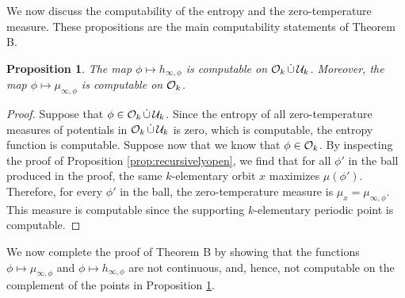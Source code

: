 \documentclass[11pt, reqno]{amsart}
\newtheorem{proposition}[theorem]{Proposition}
\newcommand{\cU}{{\mathcal U}}
\begin{document}
We now discuss the computability of the entropy and the zero-temperature measure.  These propositions are the main computability statements of Theorem B.

\begin{proposition}\label{prop:computability}
The map $\phi\mapsto h_{\infty,\phi}$ is computable on $\cO_k\,\dot\cup\,\cU_k$.  Moreover, the map $\phi\mapsto \mu_{\infty,\phi}$ is computable on $\mathcal O_k$.
\end{proposition}
\begin{proof}
Suppose that $\phi\in\cO_k\,\dot\cup\,\cU_k$.  Since the entropy of all zero-temperature measures of potentials in $\cO_k\,\dot\cup\,\cU_k$ is zero, which is computable, the entropy function is computable.  Suppose now that we know that $\phi\in\mathcal O_k$.  By inspecting the proof of Proposition \ref{prop:recursivelyopen}, we find that for all $\phi'$ in the ball produced in the proof, the same $k$-elementary orbit $x$ maximizes $\mu(\phi')$.  Therefore, for every $\phi'$ in the ball, the zero-temperature measure is $\mu_x=\mu_{\infty,\phi}$.  This measure is computable since the supporting $k$-elementary periodic point is computable.
\end{proof}

We now complete the proof of Theorem B by showing that the functions $\phi\mapsto \mu_{\infty,\phi}$ and $\phi\mapsto h_{\infty,\phi}$ are not continuous, and, hence, not computable on the complement of the points in Proposition \ref{prop:computability}.
\end{document}
